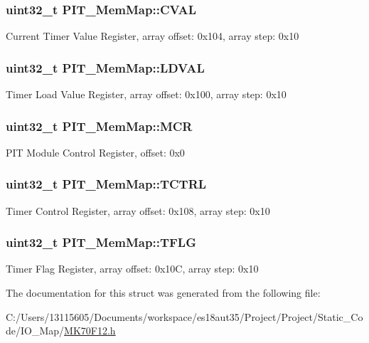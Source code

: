 \subsubsection[{C\+V\+A\+L}]{\setlength{\rightskip}{0pt plus 5cm}uint32\+\_\+t P\+I\+T\+\_\+\+Mem\+Map\+::\+C\+V\+A\+L}\label{struct_p_i_t___mem_map_a7d3d1a5913a28cfb4ca0e120ebf37087}
Current Timer Value Register, array offset\+: 0x104, array step\+: 0x10 \hypertarget{struct_p_i_t___mem_map_ad664bbe0f8b53ee1e533727db4da3fb2}{}
\subsubsection[{L\+D\+V\+A\+L}]{\setlength{\rightskip}{0pt plus 5cm}uint32\+\_\+t P\+I\+T\+\_\+\+Mem\+Map\+::\+L\+D\+V\+A\+L}\label{struct_p_i_t___mem_map_ad664bbe0f8b53ee1e533727db4da3fb2}
Timer Load Value Register, array offset\+: 0x100, array step\+: 0x10 \hypertarget{struct_p_i_t___mem_map_a99390c5764693e07c37d40ead441a7a4}{}
\subsubsection[{M\+C\+R}]{\setlength{\rightskip}{0pt plus 5cm}uint32\+\_\+t P\+I\+T\+\_\+\+Mem\+Map\+::\+M\+C\+R}\label{struct_p_i_t___mem_map_a99390c5764693e07c37d40ead441a7a4}
P\+I\+T Module Control Register, offset\+: 0x0 \hypertarget{struct_p_i_t___mem_map_a567cdea5c7d615341f95f1438020a7e1}{}
\subsubsection[{T\+C\+T\+R\+L}]{\setlength{\rightskip}{0pt plus 5cm}uint32\+\_\+t P\+I\+T\+\_\+\+Mem\+Map\+::\+T\+C\+T\+R\+L}\label{struct_p_i_t___mem_map_a567cdea5c7d615341f95f1438020a7e1}
Timer Control Register, array offset\+: 0x108, array step\+: 0x10 \hypertarget{struct_p_i_t___mem_map_add88e740d4ec7a83e66cf9ad79cd027a}{}
\subsubsection[{T\+F\+L\+G}]{\setlength{\rightskip}{0pt plus 5cm}uint32\+\_\+t P\+I\+T\+\_\+\+Mem\+Map\+::\+T\+F\+L\+G}\label{struct_p_i_t___mem_map_add88e740d4ec7a83e66cf9ad79cd027a}
Timer Flag Register, array offset\+: 0x10\+C, array step\+: 0x10 

The documentation for this struct was generated from the following file\+:\begin{DoxyCompactItemize}
\item 
C\+:/\+Users/13115605/\+Documents/workspace/es18aut35/\+Project/\+Project/\+Static\+\_\+\+Code/\+I\+O\+\_\+\+Map/\hyperlink{_m_k70_f12_8h}{M\+K70\+F12.\+h}\end{DoxyCompactItemize}
